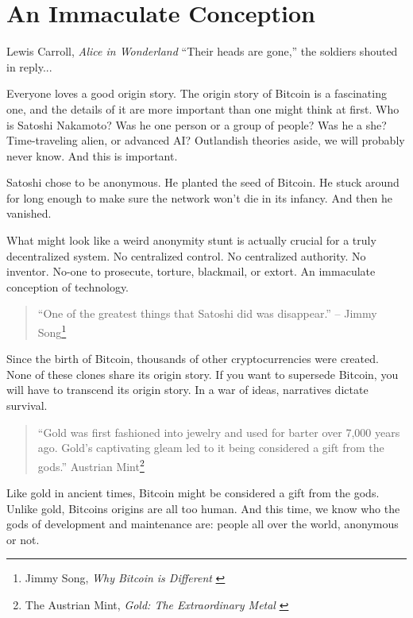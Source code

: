 \chapter{An Immaculate Conception}
\label{les:5}

\begin{chapquote}{Lewis Carroll, \textit{Alice in Wonderland}}
``Their heads are gone,'' the soldiers shouted in reply...
\end{chapquote}

Everyone loves a good origin story. The origin story of Bitcoin is a
fascinating one, and the details of it are more important than one might
think at first. Who is Satoshi Nakamoto? Was he one person or a group of
people? Was he a she? Time-traveling alien, or advanced AI? Outlandish
theories aside, we will probably never know. And this is important.

Satoshi chose to be anonymous. He planted the seed of Bitcoin. He stuck
around for long enough to make sure the network won't die in its
infancy. And then he vanished.

What might look like a weird anonymity stunt is actually crucial for a
truly decentralized system. No centralized control. No centralized
authority. No inventor. No-one to prosecute, torture, blackmail, or
extort. An immaculate conception of technology.

\begin{quotation}
``One of the greatest things that Satoshi did was disappear.''
\flushright -- Jimmy Song\footnote{Jimmy Song, \textit{Why Bitcoin is Different} \cite{bitcoin-different}}
\end{quotation}

Since the birth of Bitcoin, thousands of other cryptocurrencies were
created. None of these clones share its origin story. If you want to
supersede Bitcoin, you will have to transcend its origin story. In a war
of ideas, narratives dictate survival.

\begin{quotation}
``Gold was first fashioned into jewelry and used for barter over 7,000
years ago. Gold's captivating gleam led to it being considered a gift
from the gods.''
\flushright Austrian Mint\footnote{The Austrian Mint, \textit{Gold: The Extraordinary Metal} \cite{gold-gift-gods}}
\end{quotation}

Like gold in ancient times, Bitcoin might be considered a gift from the
gods. Unlike gold, Bitcoins origins are all too human. And this time, we
know who the gods of development and maintenance are: people all over
the world, anonymous or not.

